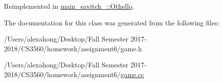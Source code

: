 Reimplemented in \hyperlink{classmain__savitch__14_1_1_othello_a4ea78b18eea66c944c0a9356349e0fd4}{main\+\_\+savitch\+\_\+::\+Othello}.



The documentation for this class was generated from the following files\+:\begin{DoxyCompactItemize}
\item 
/\+Users/alexahong/\+Desktop/\+Fall Semester 2017-\/2018/\+C\+S3560/homework/assignment6/game.\+h\item 
/\+Users/alexahong/\+Desktop/\+Fall Semester 2017-\/2018/\+C\+S3560/homework/assignment6/\hyperlink{game_8cc}{game.\+cc}\end{DoxyCompactItemize}
